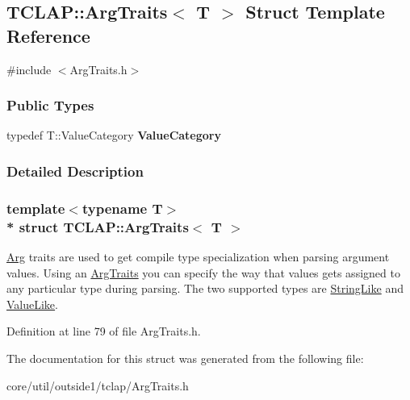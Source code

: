 \hypertarget{structTCLAP_1_1ArgTraits}{}\subsection{T\+C\+L\+AP\+:\+:Arg\+Traits$<$ T $>$ Struct Template Reference}
\label{structTCLAP_1_1ArgTraits}


{\ttfamily \#include $<$Arg\+Traits.\+h$>$}

\subsubsection*{Public Types}
\begin{DoxyCompactItemize}
\item 
typedef T\+::\+Value\+Category {\bfseries Value\+Category}\hypertarget{structTCLAP_1_1ArgTraits_a346532973520fc820d6b3e5406dfa8f6}{}\label{structTCLAP_1_1ArgTraits_a346532973520fc820d6b3e5406dfa8f6}

\end{DoxyCompactItemize}


\subsubsection{Detailed Description}
\subsubsection*{template$<$typename T$>$\\*
struct T\+C\+L\+A\+P\+::\+Arg\+Traits$<$ T $>$}

\hyperlink{classTCLAP_1_1Arg}{Arg} traits are used to get compile type specialization when parsing argument values. Using an \hyperlink{structTCLAP_1_1ArgTraits}{Arg\+Traits} you can specify the way that values gets assigned to any particular type during parsing. The two supported types are \hyperlink{structTCLAP_1_1StringLike}{String\+Like} and \hyperlink{structTCLAP_1_1ValueLike}{Value\+Like}. 

Definition at line 79 of file Arg\+Traits.\+h.



The documentation for this struct was generated from the following file\+:\begin{DoxyCompactItemize}
\item 
core/util/outside1/tclap/Arg\+Traits.\+h\end{DoxyCompactItemize}

